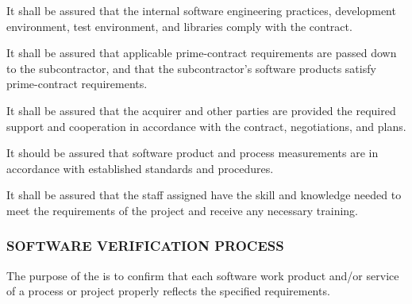 \begin{adjustwidth}{2em}{0pt}
\begin{compactenum}
\begin{compactenum}
						\item It shall be assured that the internal software engineering practices, development environment, test environment, and libraries comply with the contract.

						\item It shall be assured that applicable prime-contract requirements are passed down to the subcontractor, and that the subcontractor's software products satisfy prime-contract requirements.

						\item It shall be assured that the acquirer and other parties are provided the required support and cooperation in accordance with the contract, negotiations, and plans.

						\item It should be assured that software product and process measurements are in accordance with established standards and procedures.

						\item It shall be assured that the staff assigned have the skill and knowledge needed to meet the requirements of the project and receive any necessary training.

					\end{compactenum}

				\end{compactenum}

			\end{adjustwidth}

		\newpage
		\subsubsection{SOFTWARE VERIFICATION PROCESS\label{proc:software_verification_process}}

			\begin{adjustwidth}{2em}{0pt} 

				The purpose of the  is to confirm that each software work product and/or service of a process or project properly reflects the specified requirements.

			\end{adjustwidth}

